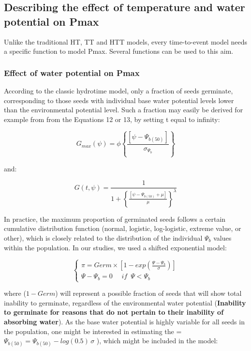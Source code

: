 \documentclass[a4paper,12pt]{article}
\begin{document}
\subsection{Describing the effect of temperature and water potential on
Pmax}\label{describing-the-effect-of-temperature-and-water-potential-on-pmax}

Unlike the traditional HT, TT and HTT models, every time-to-event model
needs a specific function to model Pmax. Several functions can be used
to this aim.

\subsubsection{Effect of water potential on
Pmax}\label{effect-of-water-potential-on-pmax}

According to the classic hydrotime model, only a fraction of seeds
germinate, corresponding to those seeds with individual base water
potential levels lower than the environmental potential level. Such a
fraction may easily be derived for example from from the Equations 12 or
13, by setting t equal to infinity:

\begin{equation}
G_{max}(\psi) = \phi \left\{ \frac{ [ \psi - \Psi_{b(50)} ] } {\sigma_{\Psi_b}} \right\}
\end{equation}

and:

\begin{equation}
G(t,\psi) = \frac{1}{ 1 + \left\{ \frac{ \left[ \psi  - \Psi_{b(50)} + \mu \right] } {\mu} \right\} ^ \lambda }
\end{equation}

In practice, the maximum proportion of germinated seeds follows a
certain cumulative distribution function (normal, logistic,
log-logistic, extreme value, or other), which is closely related to the
distribution of the individual \(\Psi_{b}\) values within the
population. In our studies, we used a shifted exponential model:

\begin{equation}
\left\{ {\begin{array}{*{20}{l}}
\pi = Germ \times \left[ 1 - exp \left( \frac{ \Psi - \Psi_b }{\sigma} \right) \right] \\
\Psi - \Psi_b = 0 \,\,\,\,\,\,\,\, if \,\,\, \Psi < \Psi_b
\end{array}} \right.
\end{equation}

where (\(1 - Germ\)) will represent a possible fraction of seeds that
will show total inability to germinate, regardless of the environmental
water potential (\textbf{Inability to germinate for reasons that do not
pertain to their inability of absorbing water}). As the base water
potential is highly variable for all seeds in the population, one might
be interested in estimating the =
\(\Psi_{b(50)} = \Psi_{b(50)} - log(0.5) \, \sigma\) ), which might be
included in the model:
\end{document}
